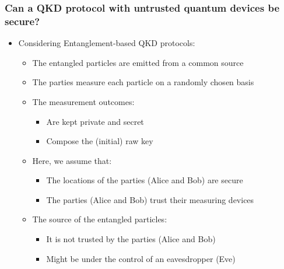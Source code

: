 \documentclass{beamer}
\begin{document}
		\begin{frame}
			\frametitle{\normalsize Can a QKD protocol with untrusted quantum devices be secure?}

            \begin{itemize}
                \item Considering Entanglement-based QKD protocols:
                \begin{itemize}\small
                    \item The entangled particles are emitted from a common source
                    \item The parties measure each particle on a randomly chosen basis
                    \item The measurement outcomes:
                    \begin{itemize}
                        \item Are kept private and secret
                        \item Compose the (initial) raw key
                    \end{itemize}
                    \item Here, we assume that:
                    \begin{itemize}
                        \item The locations of the parties (Alice and Bob) are secure
                        \item The parties (Alice and Bob) trust their measuring devices
                    \end{itemize}
                    \item The source of the entangled particles:
                    \begin{itemize}
                        \item It is not trusted by the parties (Alice and Bob)
                        \item Might be under the control of an eavesdropper (Eve)
                    \end{itemize}
                \end{itemize}
            \end{itemize}
		\end{frame}
\end{document}
